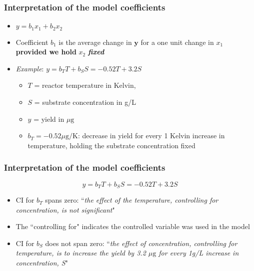 \begin{frame}\frametitle{Interpretation of the model coefficients}
	\begin{itemize}
		\item	$y = b_1x_1 + b_2x_2$
	\end{itemize}
	\begin{itemize}
		\item	Coefficient $b_1$ is the average change in $\mathbf{y}$ for a one unit change in ${x}_1$ \textbf{provided we hold} ${x}_2$ \textbf{\emph{fixed}}
	\end{itemize}
	\begin{itemize}
		\item	\emph{Example}: $y = b_T T + b_S S = -0.52 T + 3.2 S$
		\begin{itemize}
			\item	$T$ = reactor temperature in Kelvin,
			\item	$S$ = substrate concentration in g/L
			\item	$y$ = yield in $\mu\text{g}$
			\item	$b_T = -0.52 \mu\text{g}/\text{K}$: decrease in yield for every 1 Kelvin increase in temperature, holding the substrate concentration fixed
		\end{itemize}
	\end{itemize}
\end{frame}

\begin{frame}\frametitle{Interpretation of the model coefficients}

	$$y = b_T T + b_S S = -0.52 T + 3.2 S$$
	\begin{itemize}
		\item	CI for $b_T$ spans zero: ``\emph{the effect of the temperature, controlling for concentration, is not significant}"
		\item	The ``controlling for" indicates the controlled variable was used in the model
		\item	CI for $b_S$ does not span zero: ``\emph{the effect of concentration, controlling for temperature, is to increase the yield by 3.2 $\mu\text{g}$ for every 1g/L increase in concentration, S}"
	\end{itemize}
\end{frame}

